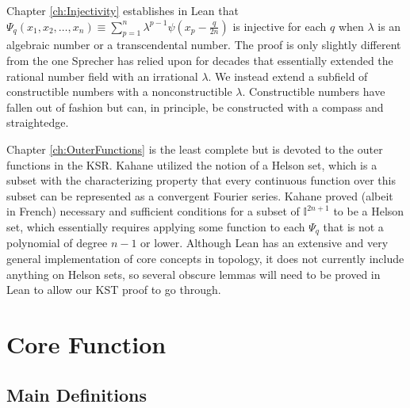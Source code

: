 Chapter \ref{ch:Injectivity} establishes in Lean that $\Psi_q\left(x_1, x_2, \dots, x_n\right) \equiv \sum\limits_{p = 1}^n \lambda^{p -1} \psi\left(x_p - \frac{q}{2n}\right)$ is injective for each $q$ when $\lambda$ is an algebraic number or a transcendental number. The proof is only slightly different from the one Sprecher has relied upon for decades that essentially extended the rational number field with an irrational $\lambda$. We instead extend a subfield of constructible numbers with a nonconstructible $\lambda$. Constructible numbers have fallen out of fashion but can, in principle, be constructed with a compass and straightedge.

Chapter \ref{ch:OuterFunctions} is the least complete but is devoted to the outer functions in the KSR. Kahane utilized the notion of a Helson set, which is a subset with the characterizing property that every continuous function over this subset can be represented as a convergent Fourier series. Kahane proved (albeit in French) necessary and sufficient conditions for a subset of $\mathbb{I}^{2n + 1}$ to be a Helson set, which essentially requires applying some function to each $\Psi_q$ that is not a polynomial of degree $n - 1$ or lower. Although Lean has an extensive and very general implementation of core concepts in topology, it does not currently include anything on Helson sets, so several obscure lemmas will need to be proved in Lean to allow our KST proof to go through.

\chapter{Core Function}\label{ch:CoreFunction}

\section{Main Definitions}\label{sec:MainDefinitions}

